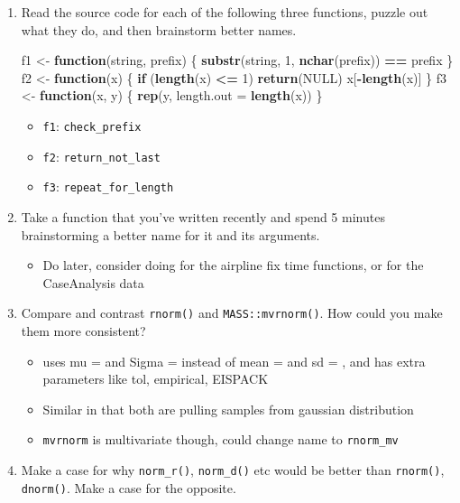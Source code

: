 \documentclass[]{book}
\newenvironment{Shaded}{\begin{snugshade}}{\end{snugshade}}
\newcommand{\ControlFlowTok}[1]{\textcolor[rgb]{0.13,0.29,0.53}{\textbf{#1}}}
\newcommand{\DataTypeTok}[1]{\textcolor[rgb]{0.13,0.29,0.53}{#1}}
\newcommand{\DecValTok}[1]{\textcolor[rgb]{0.00,0.00,0.81}{#1}}
\newcommand{\KeywordTok}[1]{\textcolor[rgb]{0.13,0.29,0.53}{\textbf{#1}}}
\newcommand{\NormalTok}[1]{#1}
\newcommand{\OperatorTok}[1]{\textcolor[rgb]{0.81,0.36,0.00}{\textbf{#1}}}
\newcommand{\OtherTok}[1]{\textcolor[rgb]{0.56,0.35,0.01}{#1}}
\newcommand{\StringTok}[1]{\textcolor[rgb]{0.31,0.60,0.02}{#1}}
\providecommand{\tightlist}{%
  \setlength{\itemsep}{0pt}\setlength{\parskip}{0pt}}
\theoremstyle{definition}
\theoremstyle{definition}
\theoremstyle{definition}
\theoremstyle{remark}
\begin{document}
\begin{enumerate}
\def\labelenumi{\arabic{enumi}.}
\item
  Read the source code for each of the following three functions, puzzle
  out what they do, and then brainstorm better names.

\begin{Shaded}
\begin{Highlighting}[]
\NormalTok{f1 <-}\StringTok{ }\ControlFlowTok{function}\NormalTok{(string, prefix) \{}
  \KeywordTok{substr}\NormalTok{(string, }\DecValTok{1}\NormalTok{, }\KeywordTok{nchar}\NormalTok{(prefix)) }\OperatorTok{==}\StringTok{ }\NormalTok{prefix}
\NormalTok{\}}
\NormalTok{f2 <-}\StringTok{ }\ControlFlowTok{function}\NormalTok{(x) \{}
  \ControlFlowTok{if}\NormalTok{ (}\KeywordTok{length}\NormalTok{(x) }\OperatorTok{<=}\StringTok{ }\DecValTok{1}\NormalTok{) }\KeywordTok{return}\NormalTok{(}\OtherTok{NULL}\NormalTok{)}
\NormalTok{  x[}\OperatorTok{-}\KeywordTok{length}\NormalTok{(x)]}
\NormalTok{\}}
\NormalTok{f3 <-}\StringTok{ }\ControlFlowTok{function}\NormalTok{(x, y) \{}
  \KeywordTok{rep}\NormalTok{(y, }\DataTypeTok{length.out =} \KeywordTok{length}\NormalTok{(x))}
\NormalTok{\}}
\end{Highlighting}
\end{Shaded}

  \begin{itemize}
  \tightlist
  \item
    \texttt{f1}: \texttt{check\_prefix}
  \item
    \texttt{f2}: \texttt{return\_not\_last}
  \item
    \texttt{f3}: \texttt{repeat\_for\_length}
  \end{itemize}
\item
  Take a function that you've written recently and spend 5 minutes
  brainstorming a better name for it and its arguments.

  \begin{itemize}
  \tightlist
  \item
    Do later, consider doing for the airpline fix time functions, or for
    the CaseAnalysis data
  \end{itemize}
\item
  Compare and contrast \texttt{rnorm()} and \texttt{MASS::mvrnorm()}.
  How could you make them more consistent?

  \begin{itemize}
  \tightlist
  \item
    uses mu = and Sigma = instead of mean = and sd = , and has extra
    parameters like tol, empirical, EISPACK
  \item
    Similar in that both are pulling samples from gaussian distribution
  \item
    \texttt{mvrnorm} is multivariate though, could change name to
    \texttt{rnorm\_mv}
  \end{itemize}
\item
  Make a case for why \texttt{norm\_r()}, \texttt{norm\_d()} etc would
  be better than \texttt{rnorm()}, \texttt{dnorm()}. Make a case for the
  opposite.


\end{enumerate}
\end{document}
